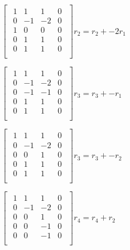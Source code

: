 \singlespacing

\begin{math}
    \begin{bmatrix}
        \begin{array}{ccc|c}
            1 & 1  & 1  & 0 \\
            0 & -1 & -2 & 0 \\
            1 & 0  & 0  & 0 \\
            0 & 1  & 1  & 0 \\
            0 & 1  & 1  & 0 \\
        \end{array}
    \end{bmatrix}r_2 = r_2 + -2r_1
\end{math}

\singlespacing

\begin{math}
    \begin{bmatrix}
        \begin{array}{ccc|c}
            1 & 1  & 1  & 0 \\
            0 & -1 & -2 & 0 \\
            0 & -1 & -1 & 0 \\
            0 & 1  & 1  & 0 \\
            0 & 1  & 1  & 0 \\
        \end{array}
    \end{bmatrix}r_3 = r_3 + -r_1
\end{math}

\singlespacing

\begin{math}
    \begin{bmatrix}
        \begin{array}{ccc|c}
            1 & 1  & 1  & 0 \\
            0 & -1 & -2 & 0 \\
            0 & 0  & 1  & 0 \\
            0 & 1  & 1  & 0 \\
            0 & 1  & 1  & 0 \\
        \end{array}
    \end{bmatrix}r_3 = r_3 + -r_2
\end{math}

\singlespacing

\begin{math}
    \begin{bmatrix}
        \begin{array}{ccc|c}
            1 & 1  & 1  & 0 \\
            0 & -1 & -2 & 0 \\
            0 & 0  & 1  & 0 \\
            0 & 0  & -1 & 0 \\
            0 & 0  & -1 & 0 \\
        \end{array}
    \end{bmatrix}r_4 = r_4 + r_2
\end{math}

